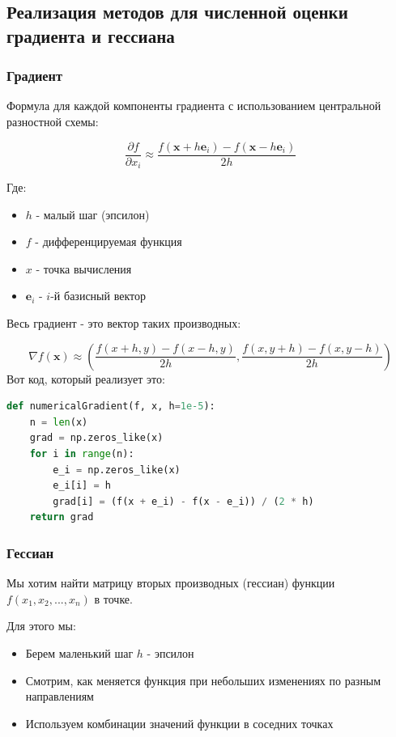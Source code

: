 \documentclass[a4paper,12pt]{article}
\begin{document}
\subsection{Реализация методов для численной оценки градиента и гессиана}
\subsubsection{Градиент}

Формула для каждой компоненты градиента с использованием центральной разностной схемы:

\[
\frac{\partial f}{\partial x_i} \approx \frac{f(\mathbf{x} + h\mathbf{e}_i) - f(\mathbf{x} - h\mathbf{e}_i)}{2h}
\]

Где:
\begin{itemize}
	\item $h$ - малый шаг (эпсилон)
	\item $f$ - дифференцируемая функция
	\item $x$ - точка вычисления
	\item $\mathbf{e}_i$ - $i$-й базисный вектор
\end{itemize}

Весь градиент - это вектор таких производных:

\[
\nabla f(\mathbf{x}) \approx \left(
\frac{f(x+h,y)-f(x-h,y)}{2h}, 
\frac{f(x,y+h)-f(x,y-h)}{2h}
\right)
\]
Вот код, который реализует это:

\begin{lstlisting}[language=python, caption={Градиент}]
def numericalGradient(f, x, h=1e-5):
	n = len(x)
	grad = np.zeros_like(x)
	for i in range(n):
		e_i = np.zeros_like(x)
		e_i[i] = h
		grad[i] = (f(x + e_i) - f(x - e_i)) / (2 * h)
	return grad
\end{lstlisting}



\subsubsection{Гессиан}

Мы хотим найти матрицу вторых производных (гессиан) функции $f(x_1, x_2, ..., x_n)$ в точке.

Для этого мы:
\begin{itemize}
	\item Берем маленький шаг $h$ - эпсилон
	\item Смотрим, как меняется функция при небольших изменениях по разным направлениям
	\item Используем комбинации значений функции в соседних точках
\end{itemize}
\end{document}
